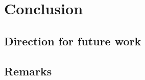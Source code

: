 
\chapter{Conclusion}
\label{chapter5}

\ifpdf
    \graphicspath{{Chapter5/Figs/Raster/}{Chapter5/Figs/PDF/}{Chapter5/Figs/}}
\else
    \graphicspath{{Chapter5/Figs/Vector/}{Chapter5/Figs/}}
\fi

\section{Direction for future work}
\label{sec:futurework}

\section{Remarks}
\label{sec:remarks}